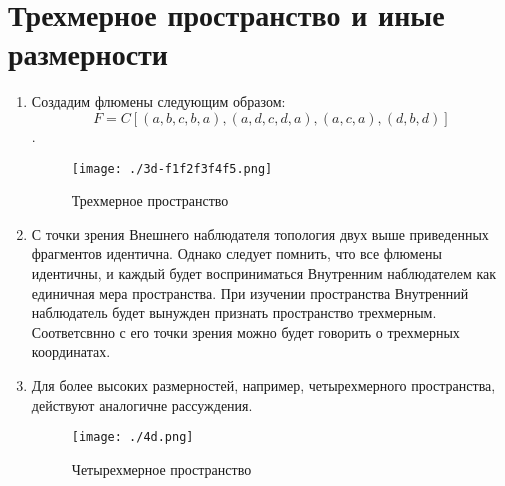 \documentclass[final]{article}
\begin{document}
    \section{Трехмерное пространство и иные размерности}
        \begin{enumerate}
            \item Создадим флюмены следующим образом: \[ F = 
            C[(a,b,c,b,a), (a,d,c,d,a), (a,c,a), (d,b,d)] \].

            \begin{figure}[H]
                \centering
                \texttt{[image: ./3d-f1f2f3f4f5.png]}
                \caption{Трехмерное пространство }
                \label{fig:image}
            \end{figure}

            \item С точки зрения Внешнего наблюдателя топология двух выше 
            приведенных фрагментов идентична. Однако следует помнить, что все 
            флюмены идентичны, и каждый будет восприниматься Внутренним наблюдателем 
            как единичная мера пространства. При изучении пространства Внутренний 
            наблюдатель будет вынужден признать пространство трехмерным. 
            Соответсвнно с его точки зрения можно будет говорить о трехмерных 
            координатах.

            \item Для более высоких размерностей, например, четырехмерного 
            пространства, действуют аналогичне рассуждения.

            \begin{figure}[H]
                \centering
                \texttt{[image: ./4d.png]}
                \caption{Четырехмерное пространство }
                \label{fig:image}
            \end{figure}

        \end{enumerate}
\end{document}
